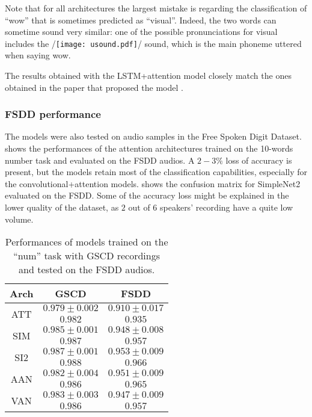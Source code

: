 Note that for all architectures the largest mistake is regarding the
classification of ``wow'' that is sometimes predicted as ``visual''. Indeed,
the two words can sometime sound very similar: one of the possible
pronunciations for visual includes the 
/\texttt{[image: usound.pdf]}/ sound, which is the main phoneme
uttered when saying wow.

The results obtained with the LSTM+attention model closely match the ones
obtained in the paper that proposed the model \cite{2018arXiv180808929C}.

\subsubsection{FSDD performance}

The models were also tested on audio samples in the Free Spoken Digit Dataset.
 shows the performances of the attention
architectures trained on the 10-words number task and evaluated on the FSDD
audios.
%
A $2-3\%$ loss of accuracy is present, but the models retain most of the
classification capabilities, especially for the convolutional+attention models.
%
 shows the
confusion matrix for SimpleNet2 evaluated on the FSDD.
%
Some of the accuracy loss might be explained in the lower quality of the
dataset, as $2$ out of $6$ speakers' recording have a quite low volume.

\begin{table}[h!]
    \centering
    \caption{Performances of models trained on the ``num'' task with GSCD
        recordings and tested on the FSDD audios.
    }
    \label{tab:fsdd_performance}
    \begin{tabular}{|c|cc|}
        \hline
        Arch & GSCD & FSDD \\
        \hline
        \multirow{2}{*}{ATT}
            & $0.979 \pm 0.002$    & $0.910 \pm 0.017$ \\
            & $0.982$              & $0.935$ \\
        \hline
        \multirow{2}{*}{SIM}
            & $0.985 \pm 0.001$    & $0.948 \pm 0.008$ \\
            & $0.987$              & $0.957$ \\
        \multirow{2}{*}{SI2}
            & $0.987 \pm 0.001$    & $0.953 \pm 0.009$ \\
            & $0.988$              & $0.966$ \\
        \multirow{2}{*}{AAN}
            & $0.982 \pm 0.004$    & $0.951 \pm 0.009$ \\
            & $0.986$              & $0.965$ \\
        \multirow{2}{*}{VAN}
            & $0.983 \pm 0.003$    & $0.947 \pm 0.009$ \\
            & $0.986$              & $0.957$ \\
        \hline
    \end{tabular}
\end{table}

